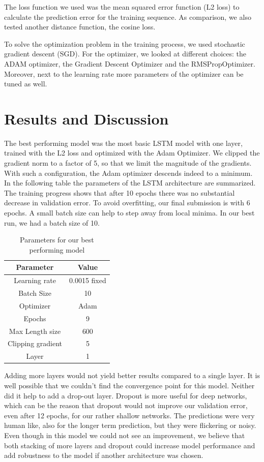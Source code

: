 The loss function we used was the mean squared error function (L2 loss) to calculate the prediction error for the training sequence. As comparison, we also tested another distance function, the cosine loss. 

To solve the optimization problem in the training process, we used stochastic gradient descent (SGD). For the optimizer, we looked at different choices: the ADAM optimizer, the Gradient Descent Optimizer and the RMSPropOptimizer. Moreover, next to the learning rate more parameters of the optimizer can be tuned as well. 


\section{Results and Discussion}

The best performing model was the most basic LSTM model with one layer, trained with the L2 loss and optimized with the Adam Optimizer. We clipped the gradient norm to a factor of 5, so that we limit the magnitude of the gradients. With such a configuration, the Adam optimizer descends indeed to a minimum. In the following table the parameters of the LSTM architecture are summarized. The training progress shows that after 10 epochs there was no substantial decrease in validation error. To avoid overfitting, our final submission is with 6 epochs. A small batch size can help to step away from local minima. In our best run, we had a batch size of 10. 

\begin{table}[]
	\centering
	\caption{Parameters for our best performing model }
	\label{my-label}
	\begin{tabular}{cc}
		Parameter& Value \\
		\hline
		\hline
		Learning rate  &  0.0015 fixed    \\
		Batch Size  & 10 \\
		Optimizer  & Adam  \\
		Epochs  & 9 \\
		Max Length size  &  600 \\
		Clipping gradient &  5\\
		Layer & 1 \\
		\hline
	\end{tabular}
\end{table}

Adding more layers would not yield better results compared to a single layer. It is well possible that we couldn't find the convergence point for this model. Neither did it help to add a drop-out layer. Dropout is more useful for deep networks, which can be the reason that dropout would not improve our validation error, even after 12 epochs, for our rather shallow networks. The predictions were very human like, also for the longer term prediction, but they were flickering or noisy. Even though in this model we could not see an improvement, we believe that both stacking of more layers and dropout could increase model performance and add robustness to the model if another architecture was chosen. 

